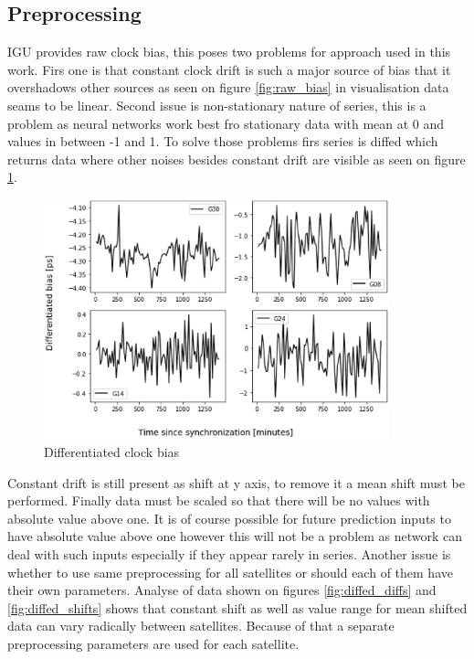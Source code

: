 \documentclass{kybernetika}
\begin{document}
\subsection{Preprocessing}
IGU provides raw clock bias, this poses two problems for approach used in this work.
Firs one is that constant clock drift is such a major source of bias that it overshadows other
sources as seen on figure \ref{fig:raw_bias} in visualisation data seams to be linear.
Second issue is non-stationary nature of series, this is a problem as neural networks work best
fro stationary data with mean at 0 and values in between -1 and 1. To solve those problems firs
series is diffed which returns data where other noises besides constant drift are visible as
seen on figure \ref{fig:diffed_bias}.
\begin{figure}[ht] 
\centering
\includegraphics[width=10cm]{figures/bias_diffed}
\caption{Differentiated clock bias}
\label{fig:diffed_bias}
\end{figure}
Constant drift is still present as shift at y axis, to remove it a mean shift must be performed.
Finally data must be scaled so that there will be no values with absolute value above one. It is
of course possible for future prediction inputs to have absolute value above one however this will
not be a problem as network can deal with such inputs especially if they appear rarely in series.
Another issue is whether to use same preprocessing for all satellites or should each of them 
have their own parameters.
Analyse of data shown on figures \ref{fig:diffed_diffs} and \ref{fig:diffed_shifts} shows that
constant shift as well as value range for mean shifted data can vary radically between satellites.
Because of that a separate preprocessing parameters are used for each satellite.
\end{document}
